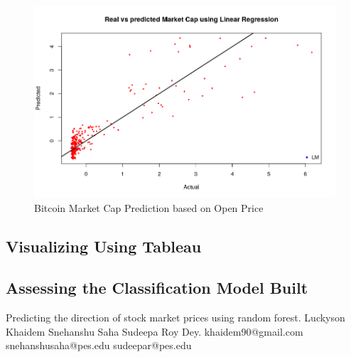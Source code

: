 \documentclass{article}
\begin{document}
\begin{figure}
	\centering
	\includegraphics[width=\linewidth]{charts/bitcoin_market_cap_using_LR}
	\caption{Bitcoin Market Cap Prediction based on Open Price}
	\label{fig:Bitcoin Market Cap Prediction}
\end{figure}

\subsection {Visualizing Using Tableau}

\subsection {Assessing the  Classification Model Built}

\begin{thebibliography}{References}
	Predicting the direction of stock market prices
	using random forest. Luckyson Khaidem Snehanshu Saha Sudeepa Roy Dey. khaidem90@gmail.com snehanshusaha@pes.edu sudeepar@pes.edu
	
\end{thebibliography}
\end{document}
